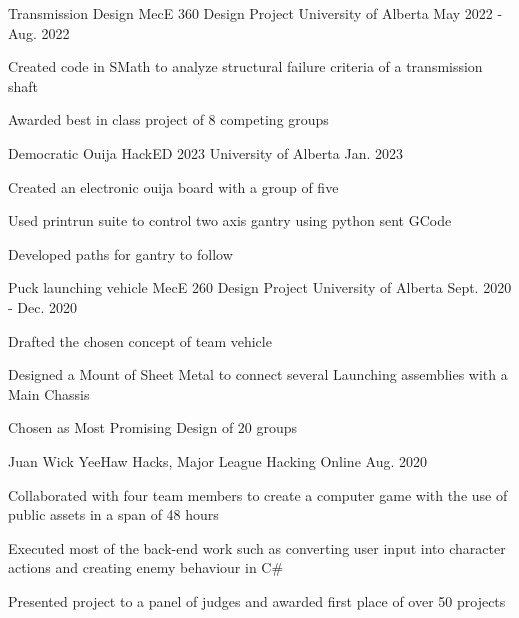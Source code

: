 \begin{cventries}
    \cventry
    {Transmission Design} %
    {MecE 360 Design Project} %
    {University of Alberta} %
    {May 2022 - Aug. 2022} %
    {
      \begin{cvitems} %
        \item Created code in SMath to analyze structural failure criteria of a transmission shaft
        \item Awarded best in class project of 8 competing groups
      \end{cvitems}
    }
    
    \cventry
    {Democratic Ouija} %
    {HackED 2023} %
    {University of Alberta} %
    {Jan. 2023} %
    {
      \begin{cvitems} %
        \item Created an electronic ouija board with a group of five
        \item Used printrun suite to control two axis gantry using python sent GCode
        \item Developed paths for gantry to follow
      \end{cvitems}
    }
    
    \cventry
    {Puck launching vehicle} %
{MecE 260 Design Project} %
{University of Alberta} %
{Sept. 2020 - Dec. 2020} %
{
  \begin{cvitems} %
    \item Drafted the chosen concept of team vehicle
    \item Designed a Mount of Sheet Metal to connect several Launching assemblies with a Main Chassis
    \item Chosen as Most Promising Design of 20 groups
  \end{cvitems}
  }
  
  \cventry
  {Juan Wick} %
  {YeeHaw Hacks, Major League Hacking} %
  {Online} %
  {Aug. 2020} %
  {
    \begin{cvitems} %
      \item Collaborated with four team members to create a computer game with the
      use of public assets in a span of 48 hours
      \item Executed most of the back-end work such as converting user input into
      character actions and creating enemy behaviour in C\#
      \item Presented project to a panel of judges and awarded first place of over 50
      projects
    \end{cvitems}
  }


\end{cventries}
